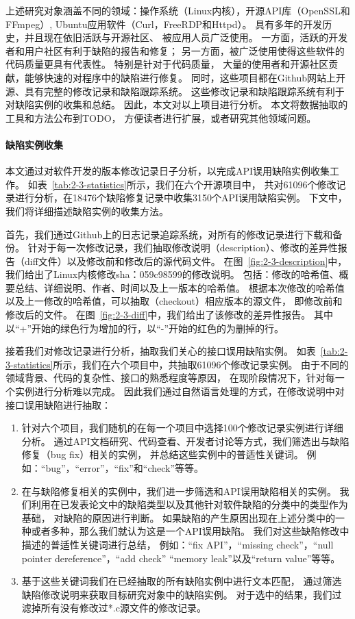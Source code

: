 上述研究对象涵盖不同的领域：操作系统（Linux内核），开源API库（OpenSSL和FFmpeg）,
Ubuntu应用软件（Curl，FreeRDP和Httpd）。
具有多年的开发历史，并且现在依旧活跃与开源社区、
被应用人员广泛使用。
一方面，活跃的开发者和用户社区有利于缺陷的报告和修复；
另一方面，被广泛使用使得这些软件的代码质量更具有代表性。
特别是针对于代码质量，
大量的使用者和开源社区贡献，能够快速的对程序中的缺陷进行修复。
同时，这些项目都在Github网站上开源、具有完整的修改记录和缺陷跟踪系统。
这些修改记录和缺陷跟踪系统有利于对缺陷实例的收集和总结。
因此，本文对以上项目进行分析。
本文将数据抽取的工具和方法公布到TODO，
方便读者进行扩展，或者研究其他领域问题。

\paragraph{缺陷实例收集}





本文通过对软件开发的版本修改记录日子分析，以完成API误用缺陷实例收集工作。
如表~\ref{tab:2-3-statistics}所示，我们在六个开源项目中，
共对61096个修改记录进行分析，在18476个缺陷修复记录中收集3150个API误用缺陷实例。
下文中，我们将详细描述缺陷实例的收集方法。

首先，我们通过Github上的日志记录追踪系统，对所有的修改记录进行下载和备份。
针对于每一次修改记录，我们抽取修改说明（description）、修改的差异性报告（diff文件）以及修改前和修改后的源代码文件。
在图~\ref{fig:2-3-description}中，我们给出了Linux内核修改sha：059c98599的修改说明。
包括：修改的哈希值、概要总结、详细说明、作者、时间以及上一版本的哈希值。
根据本次修改的哈希值以及上一修改的哈希值，可以抽取（checkout）相应版本的源文件，
即修改前和修改后的文件。
在图~\ref{fig:2-3-diff}中，我们给出了该修改的差异性报告。
其中以“+”开始的绿色行为增加的行，以“-”开始的红色的为删掉的行。

接着我们对修改记录进行分析，抽取我们关心的接口误用缺陷实例。
如表~\ref{tab:2-3-statistics}所示，我们在六个项目中，共抽取61096个修改记录实例。
由于不同的领域背景、代码的复杂性、接口的熟悉程度等原因，
在现阶段情况下，针对每一个实例进行分析难以完成。
因此我们通过自然语言处理的方式，在修改说明中对接口误用缺陷进行抽取：
\begin{enumerate}
	\item 针对六个项目，我们随机的在每一个项目中选择100个修改记录实例进行详细分析。
	通过API文档研究、代码查看、开发者讨论等方式，我们筛选出与缺陷修复（bug fix）相关的实例，
	并总结这些实例中的普适性关键词。
	例如：“bug”，“error”，“fix”和“check”等等。
	\item 在与缺陷修复相关的实例中，我们进一步筛选和API误用缺陷相关的实例。
	我们利用在已发表论文中的缺陷类型以及其他针对软件缺陷的分类中的类型作为基础，
	对缺陷的原因进行判断。
	如果缺陷的产生原因出现在上述分类中的一种或者多种，那么我们就认为这是一个API误用缺陷。
	我们对这些缺陷修改中描述的普适性关键词进行总结，
	例如：“fix API”，“missing check”，“null pointer dereference”，“add check” “memory leak”以及“return value”等等。
	\item 基于这些关键词我们在已经抽取的所有缺陷实例中进行文本匹配，
	通过筛选缺陷修改说明来获取目标研究对象中的缺陷实例。
	对于选中的结果，我们过滤掉所有没有修改过*.c源文件的修改记录。
\end{enumerate}

